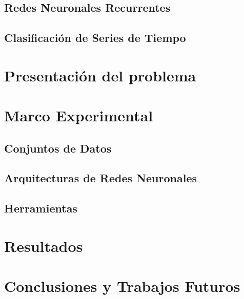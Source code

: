 \documentclass[a4paper,12pt,spanish]{book}
\begin{document}
\section{Redes Neuronales Recurrentes}


\section{Clasificación de Series de Tiempo}



\chapter{Presentación del problema}



\chapter{Marco Experimental}

\section{Conjuntos de Datos}


\section{Arquitecturas de Redes Neuronales}


\section{Herramientas}



\chapter{Resultados}


\chapter{Conclusiones y Trabajos Futuros}

\newpage
\footnotesize
% 
% 
\printbibliography

\newpage
\newpage
\vfill
\addtocounter{page}{-1}
\clearpage
\thispagestyle{empty}
\phantom{a}
\vfill
\newpage
\vfill
\addtocounter{page}{-1}
\end{document}
